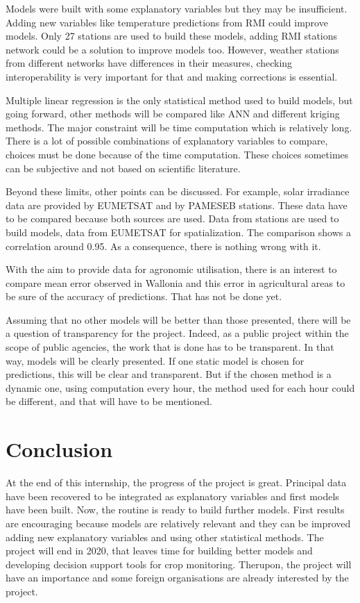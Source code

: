 \documentclass[12pt,twoside]{reedthesis}
\theoremstyle{definition}
\theoremstyle{definition}
\theoremstyle{definition}
\theoremstyle{remark}
\begin{document}
Models were built with some explanatory variables but they may be
insufficient. Adding new variables like temperature predictions from RMI
could improve models. Only 27 stations are used to build these models,
adding RMI stations network could be a solution to improve models too.
However, weather stations from different networks have differences in
their measures, checking interoperability is very important for that and
making corrections is essential.

Multiple linear regression is the only statistical method used to build
models, but going forward, other methods will be compared like ANN and
different kriging methods. The major constraint will be time computation
which is relatively long. There is a lot of possible combinations of
explanatory variables to compare, choices must be done because of the
time computation. These choices sometimes can be subjective and not
based on scientific literature.

Beyond these limits, other points can be discussed. For example, solar
irradiance data are provided by EUMETSAT and by PAMESEB stations. These
data have to be compared because both sources are used. Data from
stations are used to build models, data from EUMETSAT for
spatialization. The comparison shows a correlation around 0.95. As a
consequence, there is nothing wrong with it.

With the aim to provide data for agronomic utilisation, there is an
interest to compare mean error observed in Wallonia and this error in
agricultural areas to be sure of the accuracy of predictions. That has
not be done yet.

Assuming that no other models will be better than those presented, there
will be a question of transparency for the project. Indeed, as a public
project within the scope of public agencies, the work that is done has
to be transparent. In that way, models will be clearly presented. If one
static model is chosen for predictions, this will be clear and
transparent. But if the chosen method is a dynamic one, using
computation every hour, the method used for each hour could be
different, and that will have to be mentioned.

\chapter*{Conclusion}\label{conclusion}

At the end of this internship, the progress of the project is great.
Principal data have been recovered to be integrated as explanatory
variables and first models have been built. Now, the routine is ready to
build further models. First results are encouraging because models are
relatively relevant and they can be improved adding new explanatory
variables and using other statistical methods. The project will end in
2020, that leaves time for building better models and developing
decision support tools for crop monitoring. Therupon, the project will
have an importance and some foreign organisations are already interested
by the project.
\end{document}
